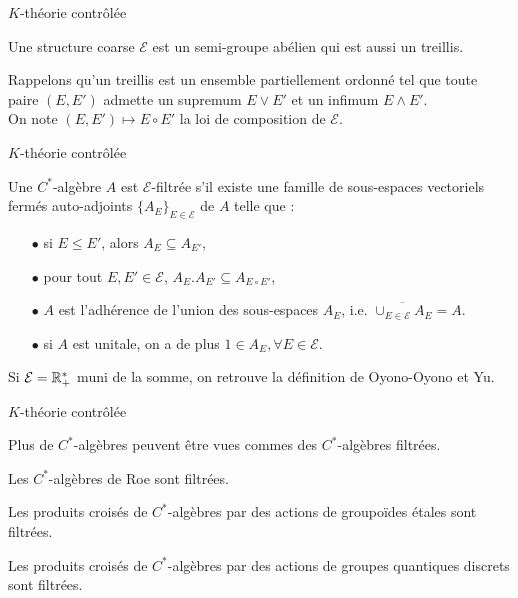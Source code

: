 
\begin{frame}{$K$-théorie contrôlée}

\begin{definitionfr}
Une structure coarse $\mathcal E$ est un semi-groupe abélien qui est aussi un treillis. \\
\end{definitionfr}
\vspace{0.3 cm}
Rappelons qu'un treillis est un ensemble partiellement ordonné tel que toute paire $(E,E')$ admette un supremum $E\vee E'$ et un infimum $E\wedge E'$.\\
\vspace{0.3 cm}
On note $(E,E')\mapsto E\circ E'$ la loi de composition de $\mathcal E$.
\end{frame}

\begin{frame}{$K$-théorie contrôlée}
\begin{definitionfr}
Une $C^*$-algèbre $A$ est $\mathcal E$-filtrée s'il existe une famille de sous-espaces vectoriels fermés auto-adjoints $\{A_E\}_{E\in\mathcal E}$ de $A$ telle que :
\begin{itemize}
\item[$\bullet$] si $E\leq E'$, alors $A_E\subseteq A_{E'}$,
\item[$\bullet$] pour tout $E,E'\in\mathcal E$, $A_E.A_{E'}\subseteq A_{E\circ E'}$,
\item[$\bullet$] $A$ est l'adhérence de l'union des sous-espaces $A_E$, i.e. $\overline{\cup_{E\in\mathcal E}A_E} = A$.
\item[$\bullet$] si $A$ est unitale, on a de plus $1\in A_E,\forall E\in\mathcal E$.
\end{itemize}
\end{definitionfr}

Si $\mathcal E = \mathbb R_+^*$ muni de la somme, on retrouve la définition de Oyono-Oyono et Yu. 
\end{frame}

\begin{frame}{$K$-théorie contrôlée}

Plus de $C^*$-algèbres peuvent être vues commes des $C^*$-algèbres filtrées.

\begin{exple}
Les $C^*$-algèbres de Roe sont filtrées.
\end{exple}

\begin{exple}
Les produits croisés de $C^*$-algèbres par des actions de groupoïdes étales sont filtrées.
\end{exple}

\begin{exple}
Les produits croisés de $C^*$-algèbres par des actions de groupes quantiques discrets sont filtrées.
\end{exple}

\end{frame}

